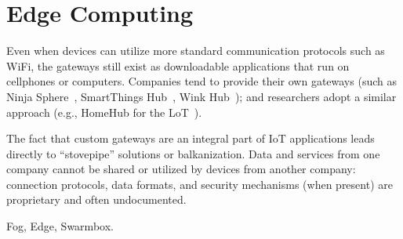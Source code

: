 \section{Edge Computing}
\label{sec:edge-computing}

Even when devices can utilize more standard communication protocols such as
WiFi, the gateways still exist as downloadable applications that run on
cellphones or computers.  Companies tend to provide their own gateways (such as
Ninja Sphere~\cite{ninja}, SmartThings Hub~\cite{smartthings}, Wink
Hub~\cite{wink}); and researchers adopt a similar approach (e.g., HomeHub for
the LoT~\cite{brush2013lab}).

The fact that custom gateways are an integral part of IoT applications leads
directly to ``stovepipe'' solutions or balkanization. Data and services from one
company cannot be shared or utilized by devices from another company: connection
protocols, data formats, and security mechanisms (when present) are proprietary
and often undocumented.

Fog, Edge, Swarmbox.

